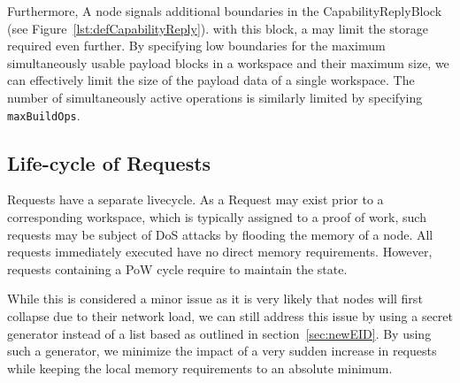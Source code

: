 Furthermore, A node signals additional boundaries in the CapabilityReplyBlock (see Figure~\ref{lst:defCapabilityReply}). with this block, a \VortexNode{} may limit the storage required even further. By specifying low boundaries for the maximum simultaneously usable payload blocks in a workspace and their maximum size, we can effectively limit the size of the payload data of a single workspace. The number of simultaneously active operations is similarly limited by specifying \texttt{maxBuildOps}.

\subsection{Life-cycle of Requests}
Requests have a separate livecycle. As a Request may exist prior to a corresponding workspace, which is typically assigned to a proof of work, such requests may be subject of DoS attacks by flooding the memory of a node. All requests immediately executed have no direct memory requirements. However, requests containing a PoW cycle require to maintain the state. 

While this is considered a minor issue as it is very likely that nodes will first collapse due to their network load, we can still address this issue by using a secret generator instead of a list based as outlined in section~\ref{sec:newEID}. By using such a generator, we minimize the impact of a very sudden increase in requests while keeping the local memory requirements to an absolute minimum. 

%


